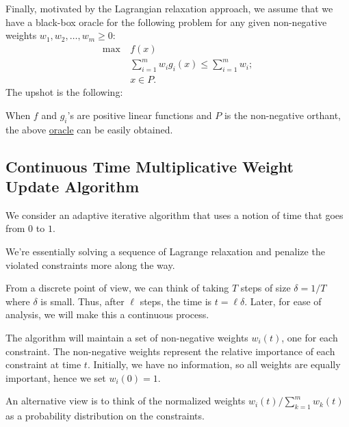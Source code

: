 Finally, motivated by the Lagrangian relaxation approach, we assume that we have a black-box oracle for the following problem for any given non-negative weights \(w_1, w_2, \dots , w_m \geq 0\):
\begin{equation}\label{eq:MWU-oracle}
	\begin{aligned}
		\max~ & f(x)                                                \\
		      & \sum_{i=1}^{m} w_i g_i(x) \leq \sum_{i=1}^{m} w_i ; \\
		      & x\in P.
	\end{aligned}
\end{equation}
The upshot is the following:

\begin{remark}
	When \(f\) and \(g_i\)'s are positive linear functions and \(P\) is the non-negative orthant, the above \hyperref[eq:MWU-oracle]{oracle} can be easily obtained.
\end{remark}

\subsection{Continuous Time Multiplicative Weight Update Algorithm}
We consider an adaptive iterative algorithm that uses a notion of time that goes from \(0\) to \(1\).

\begin{intuition}
	We're essentially solving a sequence of Lagrange relaxation and penalize the violated constraints more along the way.
\end{intuition}

From a discrete point of view, we can think of taking \(T\) steps of size \(\delta = 1 / T\) where \(\delta \) is small. Thus, after \(\ell \) steps, the time is \(t = \ell \delta \). Later, for ease of analysis, we will make this a continuous process.

The algorithm will maintain a set of non-negative weights \(w_i(t)\), one for each constraint. The non-negative weights represent the relative importance of each constraint at time \(t\). Initially, we have no information, so all weights are equally important, hence we set \(w_i(0) = 1\).

\begin{intuition}
	An alternative view is to think of the normalized weights \(w_i(t) / \sum_{k=1}^{m} w_k(t)\) as a probability distribution on the constraints.
\end{intuition}


